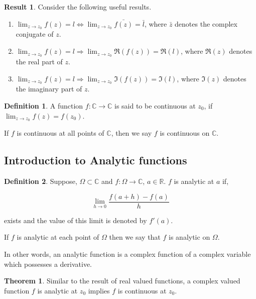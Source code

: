\documentclass[12pt]{article}
\newcommand{\R}{\mathbb{R}}
\newcommand{\C}{\mathbb{C}}
\theoremstyle{definition}
\newtheorem{thm}{Theorem}
\newtheorem{defn}{Definition}
\newtheorem{res}{Result}
\newenvironment{definition}{
\begin{tcolorbox}[colback=green!5!white,colframe=green!75!black, parbox = false]\begin{defn} }{\end{defn}\end{tcolorbox} }
\newenvironment{theorem}{
\begin{tcolorbox}[colback=green!5!white,colframe=green!75!black, parbox = false]\begin{thm} }{\end{thm}\end{tcolorbox} }
\newenvironment{result}{
\begin{tcolorbox}[colback=green!5!white,colframe=green!75!black, parbox = false]\begin{res} }{\end{res}\end{tcolorbox} }
\begin{document}
\begin{result}
    Consider the following useful results.
    \begin{enumerate}
        \item $\lim_{z \rightarrow z_0} f(z) = l \iff \lim_{z \rightarrow z_0} \bar{f(z)} = \bar{l}$, where $\bar{z}$ denotes the complex conjugate of $z$.
        \item $\lim_{z \rightarrow z_0} f(z) = l \Rightarrow \lim_{z \rightarrow z_0} \Re (f(z)) = \Re(l)$, where $\Re(z)$ denotes the real part of $z$.
        \item $\lim_{z \rightarrow z_0} f(z) = l \Rightarrow \lim_{z \rightarrow z_0} \Im(f(z)) = \Im(l)$, where $\Im(z)$ denotes the imaginary part of $z$.
    \end{enumerate}
\end{result}

\begin{definition}
    A function $f: \C \rightarrow \C$ is said to be continuous at $z_0$, if $\lim_{z \rightarrow z_0} f(z) = f(z_0)$.\par 
    If $f$ is continuous at all points of $\C$, then we say $f$ is continuous on $\C$.
\end{definition}


\subsection{Introduction to Analytic functions}

\begin{definition}
Suppose, $\Omega\subset\C$ and $f:\Omega \to \C$, $a\in \R$. $f$ is analytic at $a$ if,

\begin{equation*}
    \lim_{h\to 0}\dfrac{f(a+h)-f(a)}{h}
\end{equation*}

exists and the value of this limit is denoted by $f'(a)$.\par

If $f$ is analytic at each point of $\Omega$ then we say that $f$ is analytic on $\Omega$.\par In other words, an analytic function is a complex function of a complex variable which possesses a derivative.
\end{definition}

\begin{theorem}
    Similar to the result of real valued functions, a complex valued function $f$ is analytic at $z_0$ implies $f$ is continuous at $z_0$.
\end{theorem}
\end{document}
